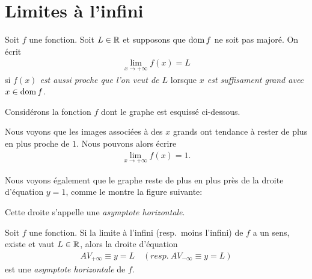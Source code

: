 \documentclass[main.tex]{subfiles}
\begin{document}
\section{Limites à l'infini}

\begin{definition}

    Soit $f$ une fonction.
    Soit $L \in \mathbb{R}$ et supposons que $\operatorname{dom} f$ ne soit pas majoré.
    On écrit
    \begin{align}
        \lim_{x \to +\infty} f(x) = L
    \end{align}
    si \emph{$f(x)$ est aussi proche que l'on veut de $L$}
    lorsque \emph{$x$ est suffisament grand avec $x \in \operatorname{dom} f$}.
\end{definition}

\begin{example}

    Considérons la fonction $f$ dont le graphe est esquissé ci-dessous.
    \begin{center}
        \begin{plot}{0.25}{-1}{-3}{30}{5}
        \end{plot}
    \end{center}

    Nous voyons que les images associées à des $x$ grands ont tendance à rester de plus en plus proche de $1$.
    Nous pouvons alors écrire
    \begin{align*}
        \lim_{x \to +\infty} f(x) = 1.
    \end{align*}

    Nous voyons également que le graphe reste de plus en plus près de la droite d'équation $y = 1$,
    comme le montre la figure suivante:
    \begin{center}
        \begin{plot}{0.25}{-1}{-3}{30}{5}
        \end{plot}
    \end{center}

    Cette droite s'appelle une \emph{asymptote horizontale}.
\end{example}

\begin{definition}

    Soit $f$ une fonction.
    Si la limite à l'infini (resp.\ moins l'infini) de $f$ a un sens, existe et vaut $L \in \mathbb{R}$,
    alors la droite d'équation
    \begin{align}
        AV_{+\infty} \equiv y = L
        \quad
        \left(resp.\ AV_{-\infty} \equiv y = L\right)
    \end{align}
    est une \emph{asymptote horizontale} de $f$.
\end{definition}
\end{document}
